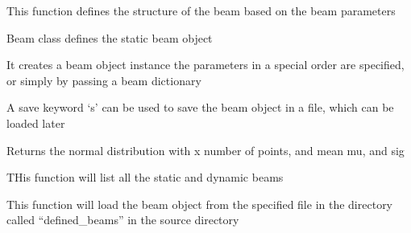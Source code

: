 \documentclass[letterpaper,10pt,english]{sphinxmanual}
\begin{document}
\begin{fulllineitems}
\begin{fulllineitems}
\end{fulllineitems}


\begin{fulllineitems}
\label{beam:beam.dynamicbeam.structure}
This function defines the structure of the beam based on the beam parameters

\end{fulllineitems}


\end{fulllineitems}


\begin{fulllineitems}
\label{beam:beam.staticbeam}
Beam class defines the static beam object

It creates a beam object instance the parameters in a special order are specified, or simply by passing a beam dictionary

A save keyword `s' can be used to save the beam object in a file, which can be loaded later

\begin{fulllineitems}
\label{beam:beam.staticbeam.gaussian}
Returns the normal distribution with x number of points, and mean mu, and sig

\end{fulllineitems}


\begin{fulllineitems}
\label{beam:beam.staticbeam.listfiles}
THis function will list all the static and dynamic beams

\end{fulllineitems}


\begin{fulllineitems}
\label{beam:beam.staticbeam.load}
This function will load the beam object from the specified file in the directory called ``defined\_beams'' in the source directory


\end{fulllineitems}
\end{fulllineitems}
\end{document}
